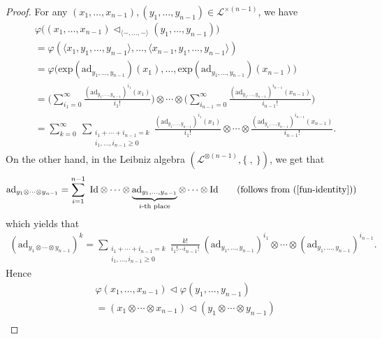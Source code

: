 \documentclass[a4paper,reqno,10pt]{amsart}
\theoremstyle{plain}
\theoremstyle{definition}
\theoremstyle{remark}
\begin{document}
\begin{proof}
    For any $(x_1, \ldots, x_{n-1}), (y_1, \ldots, y_{n-1}) \in \mathcal{L}^{\times (n-1)}$, we have
    \begin{align*}
        &\varphi \big( (x_1, \ldots, x_{n-1}) \triangleleft_{ \langle -, \ldots, - \rangle} (y_1, \ldots, y_{n-1})   \big) \\
        &= \varphi (  \langle x_1, y_1, \ldots, y_{n-1} \rangle, \ldots,  \langle x_{n-1}, y_1, \ldots, y_{n-1} \rangle  ) \\
       & = \varphi \big(  \mathrm{exp} (\mathrm{ad}_{y_1, \ldots, y_{n-1}}) (x_1), \ldots , \mathrm{exp} (\mathrm{ad}_{y_1, \ldots, y_{n-1}}) (x_{n-1})  \big) \\
        &= \big(  \sum_{i_1 = 0}^\infty \frac{ (\mathrm{ad}_{y_1, \ldots, y_{n-1}})^{i_1} (x_1) }{i_1 !}   \big) \otimes \cdots \otimes \big(   \sum_{i_{n-1} = 0}^\infty \frac{ (\mathrm{ad}_{y_1, \ldots, y_{n-1}})^{i_{n-1}} (x_{n-1}) }{i_{n-1} !}   \big)\\
       & = \sum_{k=0}^\infty ~\sum_{\substack{ i_1 + \cdots + i_{n-1} = k \\ i_1, \ldots, i_{n-1} \geq 0}} \frac{ (\mathrm{ad}_{y_1, \ldots, y_{n-1}})^{i_1} (x_1) }{i_1 !} \otimes \cdots \otimes \frac{ (\mathrm{ad}_{y_1, \ldots, y_{n-1}})^{i_{n-1}} (x_{n-1}) }{i_{n-1} !}.
    \end{align*}
    On the other hand, in the Leibniz algebra $(\mathcal{L}^{\otimes (n-1)}, \{ ~, ~ \})$, we get that 
    \begin{align*}
        \mathrm{ad}_{y_1 \otimes \cdots \otimes y_{n-1}} = \sum_{i=1}^{n-1} ~ \mathrm{Id} \otimes \cdots \otimes \underbrace{\mathrm{ad}_{y_1, \ldots, y_{n-1}} }_{i\text{-th place}} \otimes \cdots \otimes \mathrm{Id} \qquad (\text{follows from } (\ref{fun-identity}))
    \end{align*}
    which yields that
    \begin{align}\label{ad-k}
        (\mathrm{ad}_{y_1 \otimes \cdots \otimes y_{n-1}})^k = \sum_{\substack{ i_1 + \cdots + i_{n-1} = k \\ i_1, \ldots, i_{n-1} \geq 0}} \frac{k!}{i_1 ! \cdots i_{n-1}!} ~ (\mathrm{ad}_{y_1, \ldots, y_{n-1}})^{i_1} \otimes \cdots \otimes  (\mathrm{ad}_{y_1, \ldots, y_{n-1}})^{i_{n-1}}.
    \end{align}
    Hence 
    \begin{align*}
        &\varphi (x_1, \ldots, x_{n-1}) \triangleleft \varphi (y_1, \ldots, y_{n-1}) \\
       & = (x_1 \otimes \cdots \otimes x_{n-1}) \triangleleft (y_1 \otimes \cdots \otimes y_{n-1})\\

\end{align*}
\end{proof}
\end{document}
